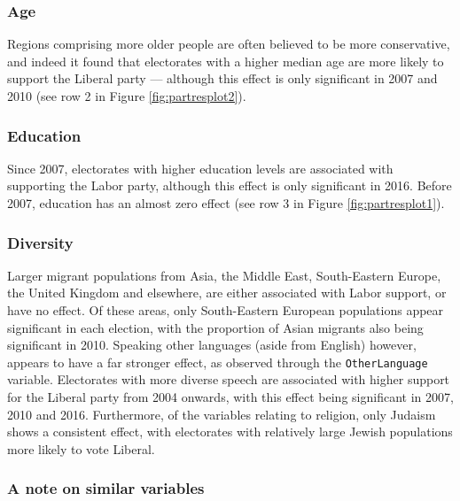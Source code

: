 \documentclass[times, doublespace]{anzsauth}
\begin{document}
\hypertarget{age}{%
\subsubsection{Age}\label{age}}

Regions comprising more older people are often believed to be more conservative, and indeed it found that electorates with a higher median age are more likely to support the Liberal party --- although this effect is only significant in 2007 and 2010 (see row 2 in Figure \ref{fig:partresplot2}).

\hypertarget{education}{%
\subsubsection{Education}\label{education}}

Since 2007, electorates with higher education levels are associated with supporting the Labor party, although this effect is only significant in 2016. Before 2007, education has an almost zero effect (see row 3 in Figure \ref{fig:partresplot1}).

\hypertarget{diversity}{%
\subsubsection{Diversity}\label{diversity}}

Larger migrant populations from Asia, the Middle East, South-Eastern Europe, the United Kingdom and elsewhere, are either associated with Labor support, or have no effect. Of these areas, only South-Eastern European populations appear significant in each election, with the proportion of Asian migrants also being significant in 2010. Speaking other languages (aside from English) however, appears to have a far stronger effect, as observed through the \texttt{OtherLanguage} variable. Electorates with more diverse speech are associated with higher support for the Liberal party from 2004 onwards, with this effect being significant in 2007, 2010 and 2016. Furthermore, of the variables relating to religion, only Judaism shows a consistent effect, with electorates with relatively large Jewish populations more likely to vote Liberal.

\hypertarget{a-note-on-similar-variables}{%
\subsubsection{A note on similar variables}\label{a-note-on-similar-variables}}
\end{document}
